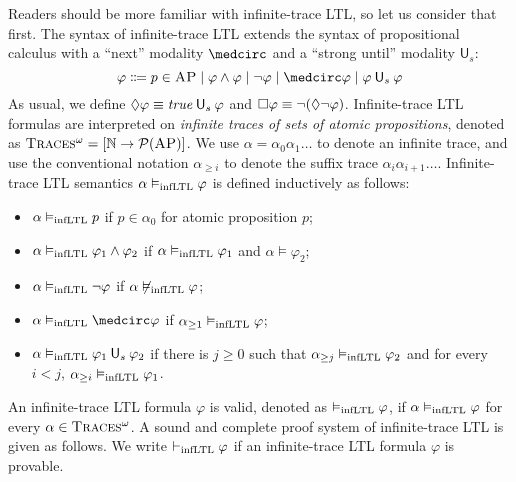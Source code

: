 \documentclass{amsart}
\begin{document}
Readers should be more familiar with infinite-trace LTL, 
so let us consider that first.
The syntax of infinite-trace LTL 
extends the syntax of propositional calculus
with a ``next'' modality $\wnext$ 
and a ``strong until'' modality $\mathsf{U}_s$:
$$
\varphi \Coloneqq p \in \AP
\mid \varphi \wedge \varphi
\mid \neg \varphi
\mid \wnext \varphi
\mid \varphi \Us \varphi
$$
As usual,
we define ${\lozenge} \varphi \equiv \mathit{true} \mathbin{\mathsf{U}_s} \varphi$
and ${\square} \varphi \equiv \neg ({\lozenge} \neg \varphi)$.
Infinite-trace LTL formulas are interpreted on 
\emph{infinite traces of sets of atomic propositions},
denoted as $\textsc{Traces$^\omega$} = [ \mathbb{N} \to \mathcal{P}(\textsc{AP})]$.
We use $\alpha = \alpha_0\alpha_1\dots$
to denote an infinite trace,
and use the conventional notation
$\alpha_{\ge i}$ to denote the suffix trace
$\alpha_i \alpha_{i+1} \dots$.
Infinite-trace LTL semantics $\alpha \vDash_{\mathrm{infLTL}} \varphi$ is defined 
inductively as follows:
\begin{itemize}
	\item $\alpha \vDash_{\mathrm{infLTL}} p$ if $p \in \alpha_0$ for atomic proposition $p$;
	\item $\alpha \vDash_{\mathrm{infLTL}} \varphi_1 \wedge \varphi_2$
	if $\alpha \vDash_{\mathrm{infLTL}} \varphi_1$ and $\alpha \vDash \varphi_2$;
	\item $\alpha \vDash_{\mathrm{infLTL}} \neg \varphi$
	if $\alpha \not\vDash_{\mathrm{infLTL}} \varphi$;
	\item $\alpha  \vDash_\infLTL \wnext \varphi$
	if $\alpha_{\ge 1} \vDash_{\mathrm{infLTL}} \varphi$;
	\item $\alpha \vDash_{\mathrm{infLTL}} \varphi_1 \mathbin{\mathsf{U}_s} \varphi_2$
	if there is $j \ge 0$ such that
	$\alpha_{\ge j} \vDash_{\mathrm{infLTL}} \varphi_2$ and for every $i < j$,
	$\alpha_{\ge i} \vDash_{\mathrm{infLTL}} \varphi_1$.
\end{itemize}
An infinite-trace LTL formula $\varphi$ is valid,
denoted as $\vDash_{\mathrm{infLTL}} \varphi$,
if $\alpha \vDash_{\mathrm{infLTL}} \varphi$ 
for every $\alpha \in \textsc{Traces$^\omega$}$.
A sound and complete proof system of infinite-trace LTL
is given as follows.
We write $\vdash_{\mathrm{infLTL}} \varphi$
if an infinite-trace LTL formula $\varphi$ is provable.
\end{document}
